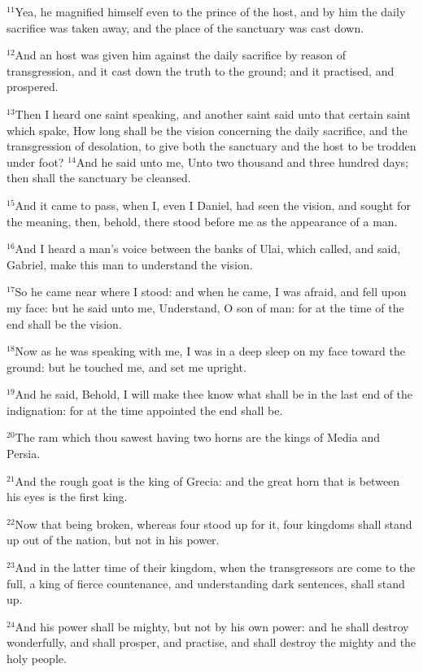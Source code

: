 \documentclass[12pt]{article}
\begin{document}
$^{11}$Yea, he magnified himself even to the prince of the host, and by
him the daily sacrifice was taken away, and the place of the sanctuary
was cast down.


$^{12}$And an host was given him against the daily sacrifice by reason
of transgression, and it cast down the truth to the ground; and it
practised, and prospered.


$^{13}$Then I heard one saint speaking, and another saint said unto that
certain saint which spake, How long shall be the vision concerning the
daily sacrifice, and the transgression of desolation, to give both the
sanctuary and the host to be trodden under foot?  $^{14}$And he said
unto me, Unto two thousand and three hundred days; then shall the
sanctuary be cleansed.


$^{15}$And it came to pass, when I, even I Daniel, had seen the vision,
and sought for the meaning, then, behold, there stood before me as the
appearance of a man.


$^{16}$And I heard a man's voice between the banks of Ulai, which
called, and said, Gabriel, make this man to understand the vision.


$^{17}$So he came near where I stood: and when he came, I was afraid,
and fell upon my face: but he said unto me, Understand, O son of man:
for at the time of the end shall be the vision.


$^{18}$Now as he was speaking with me, I was in a deep sleep on my face
toward the ground: but he touched me, and set me upright.


$^{19}$And he said, Behold, I will make thee know what shall be in the
last end of the indignation: for at the time appointed the end shall
be.


$^{20}$The ram which thou sawest having two horns are the kings of Media
and Persia.


$^{21}$And the rough goat is the king of Grecia: and the great horn that
is between his eyes is the first king.


$^{22}$Now that being broken, whereas four stood up for it, four
kingdoms shall stand up out of the nation, but not in his power.


$^{23}$And in the latter time of their kingdom, when the transgressors
are come to the full, a king of fierce countenance, and understanding
dark sentences, shall stand up.


$^{24}$And his power shall be mighty, but not by his own power: and he
shall destroy wonderfully, and shall prosper, and practise, and shall
destroy the mighty and the holy people.
\end{document}
